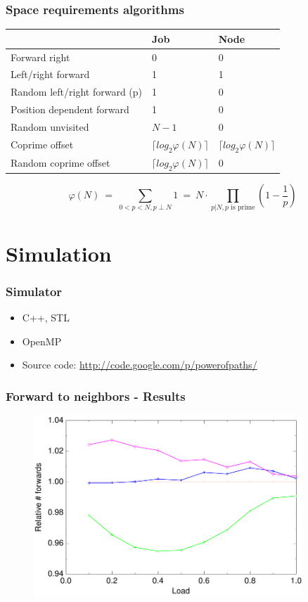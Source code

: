 \documentclass[compress]{beamer}
\begin{document}
\begin{frame}
\frametitle{Space requirements algorithms}
\begin{table}[h!]
\centering
\begin{tabular}{|p{}|p{}|p{}|} \cline{2-3}
\multicolumn{1}{l|}{}		& Job				& Node \\ \hline
Forward right			& 0				& 0		\\ \hline
Left/right forward		& 1				& 1		\\ \hline
Random left/right forward (p)	& 1				& 0		\\ \hline
Position dependent forward	& 1				& 0		\\ \hline
Random unvisited		& $N-1$				& 0		\\ \hline
Coprime offset			& $\lceil log_2 \varphi(N) \rceil$	& $\lceil log_2 \varphi(N) \rceil$ \\ \hline
Random coprime offset		& $\lceil log_2 \varphi(N) \rceil$	& 0		\\ \hline
\end{tabular}
\end{table}

\[
\varphi(N) ~=~ \sum_{0 < p < N, p \perp N} 1 ~=~  N \cdot \prod_{p|N, p\text{ is prime}} (1-\frac{1}{p})
\]

\end{frame}

\section{Simulation}
\begin{frame}
\frametitle{Simulator}
\begin{itemize}
 \item C++, STL
 \item OpenMP
 \item Source code: \url{http://code.google.com/p/powerofpaths/}
\end{itemize}
\end{frame}

\begin{frame}
\frametitle{Forward to neighbors - Results}
\begin{figure}[h!tb]
 \includegraphics[width=0.9\textwidth]{../data/neighbors.pdf}
 \end{figure}
\end{frame}
\end{document}
